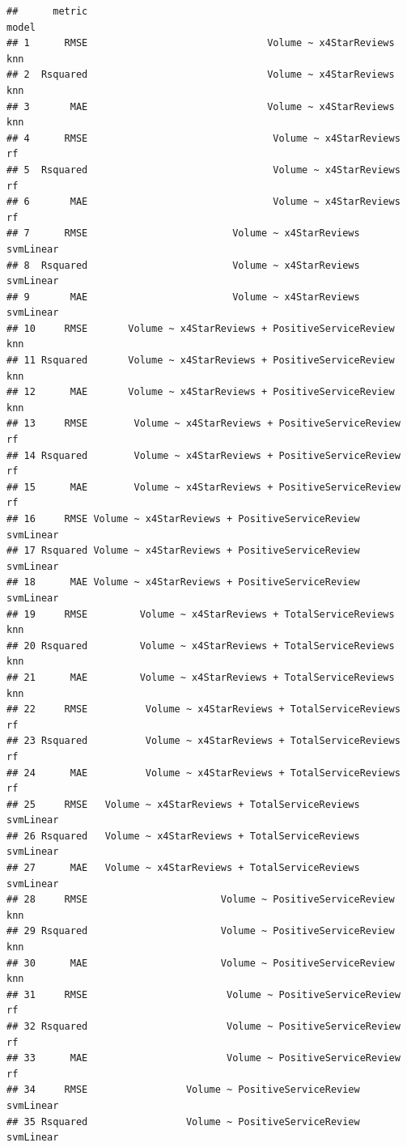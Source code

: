 \documentclass[]{article}
\begin{document}
\begin{verbatim}
##      metric                                                    model
## 1      RMSE                               Volume ~ x4StarReviews knn
## 2  Rsquared                               Volume ~ x4StarReviews knn
## 3       MAE                               Volume ~ x4StarReviews knn
## 4      RMSE                                Volume ~ x4StarReviews rf
## 5  Rsquared                                Volume ~ x4StarReviews rf
## 6       MAE                                Volume ~ x4StarReviews rf
## 7      RMSE                         Volume ~ x4StarReviews svmLinear
## 8  Rsquared                         Volume ~ x4StarReviews svmLinear
## 9       MAE                         Volume ~ x4StarReviews svmLinear
## 10     RMSE       Volume ~ x4StarReviews + PositiveServiceReview knn
## 11 Rsquared       Volume ~ x4StarReviews + PositiveServiceReview knn
## 12      MAE       Volume ~ x4StarReviews + PositiveServiceReview knn
## 13     RMSE        Volume ~ x4StarReviews + PositiveServiceReview rf
## 14 Rsquared        Volume ~ x4StarReviews + PositiveServiceReview rf
## 15      MAE        Volume ~ x4StarReviews + PositiveServiceReview rf
## 16     RMSE Volume ~ x4StarReviews + PositiveServiceReview svmLinear
## 17 Rsquared Volume ~ x4StarReviews + PositiveServiceReview svmLinear
## 18      MAE Volume ~ x4StarReviews + PositiveServiceReview svmLinear
## 19     RMSE         Volume ~ x4StarReviews + TotalServiceReviews knn
## 20 Rsquared         Volume ~ x4StarReviews + TotalServiceReviews knn
## 21      MAE         Volume ~ x4StarReviews + TotalServiceReviews knn
## 22     RMSE          Volume ~ x4StarReviews + TotalServiceReviews rf
## 23 Rsquared          Volume ~ x4StarReviews + TotalServiceReviews rf
## 24      MAE          Volume ~ x4StarReviews + TotalServiceReviews rf
## 25     RMSE   Volume ~ x4StarReviews + TotalServiceReviews svmLinear
## 26 Rsquared   Volume ~ x4StarReviews + TotalServiceReviews svmLinear
## 27      MAE   Volume ~ x4StarReviews + TotalServiceReviews svmLinear
## 28     RMSE                       Volume ~ PositiveServiceReview knn
## 29 Rsquared                       Volume ~ PositiveServiceReview knn
## 30      MAE                       Volume ~ PositiveServiceReview knn
## 31     RMSE                        Volume ~ PositiveServiceReview rf
## 32 Rsquared                        Volume ~ PositiveServiceReview rf
## 33      MAE                        Volume ~ PositiveServiceReview rf
## 34     RMSE                 Volume ~ PositiveServiceReview svmLinear
## 35 Rsquared                 Volume ~ PositiveServiceReview svmLinear

\end{verbatim}
\end{document}
